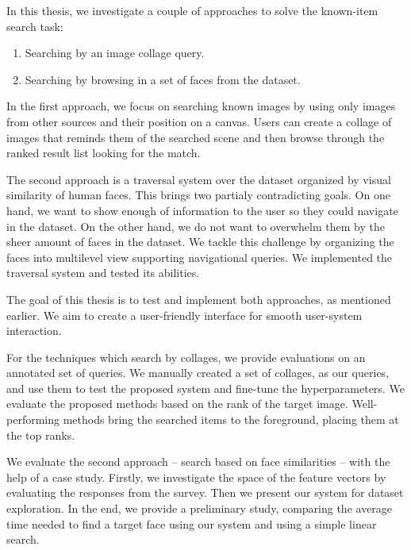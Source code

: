In this thesis, we investigate a couple of approaches to solve the known-item search task:

\begin{enumerate}
  \item Searching by an image collage query.
  \item Searching by browsing in a set of faces from the dataset.
\end{enumerate}

In the first approach, we focus on searching known images by using only images from other sources and their position on a canvas. Users can create a collage of images that reminds them of the searched scene and then browse through the ranked result list looking for the match.

The second approach is a traversal system over the dataset organized by visual similarity of human faces. This brings two partialy contradicting goals. On one hand, we want to show enough of information to the user so they could navigate in the dataset. On the other hand, we do not want to overwhelm them by the sheer amount of faces in the dataset. We tackle this challenge by organizing the faces into multilevel view supporting navigational queries. We implemented the traversal system and tested its abilities.


The goal of this thesis is to test and implement both approaches, as mentioned earlier. We aim to create a user-friendly interface for smooth user-system interaction.

For the techniques which search by collages, we provide evaluations on an annotated set of queries. We manually created a set of collages, as our queries, and use them to test the proposed system and fine-tune the hyperparameters. We evaluate the proposed methods based on the rank of the target image. Well-performing methods bring the searched items to the foreground, placing them at the top ranks.

We evaluate the second approach -- search based on face similarities -- with the help of a case study. Firstly, we investigate the space of the feature vectors by evaluating the responses from the survey. Then we present our system for dataset exploration. In the end, we provide a preliminary study, comparing the average time needed to find a target face using our system and using a simple linear search.

